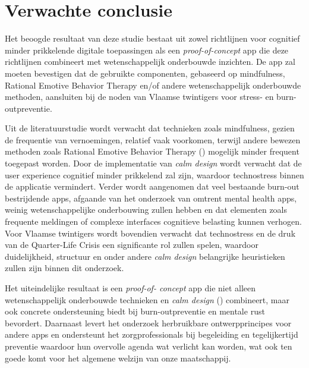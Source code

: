 \section{Verwachte conclusie}%
\label{sec:verwachte_resultaten}

\vspace{1em}

Het beoogde resultaat van deze studie bestaat uit zowel richtlijnen voor cognitief minder prikkelende digitale toepassingen als een \emph{proof-of-concept} app die deze richtlijnen combineert met wetenschappelijk onderbouwde inzichten. De app zal moeten bevestigen dat de gebruikte componenten, gebaseerd op mindfulness, Rational Emotive Behavior Therapy en/of andere wetenschappelijk onderbouwde methoden, aansluiten bij de noden van Vlaamse twintigers voor stress- en burn-outpreventie. 

\vspace{1em}

Uit de literatuurstudie wordt verwacht dat technieken zoals mindfulness, gezien de frequentie van vernoemingen, relatief vaak voorkomen, terwijl andere bewezen methoden zoals Rational Emotive Behavior Therapy (\textcite{Madigan2023}) mogelijk minder frequent toegepast worden. Door de implementatie van \emph{calm design} wordt verwacht dat de user experience cognitief minder prikkelend zal zijn, waardoor technostress binnen de applicatie vermindert. Verder wordt aangenomen dat veel bestaande burn-out bestrijdende apps, afgaande van het onderzoek van \textcite{Larsen2019} omtrent mental health apps, weinig wetenschappelijke onderbouwing zullen hebben en dat elementen zoals frequente meldingen of complexe interfaces cognitieve belasting kunnen verhogen. Voor Vlaamse twintigers wordt bovendien verwacht dat technostress en de druk van de Quarter-Life Crisis een significante rol zullen spelen, waardoor duidelijkheid, structuur en onder andere \emph{calm design} belangrijke heuristieken zullen zijn binnen dit onderzoek.

\vspace{1em}

Het uiteindelijke resultaat is een \emph{proof-of- \newline concept} app die niet alleen wetenschappelijk onderbouwde technieken en \emph{calm design} (\textcite{Peters2022}) combineert, maar ook concrete ondersteuning biedt bij burn-outpreventie en mentale rust bevordert. Daarnaast levert het onderzoek herbruikbare ontwerpprincipes voor andere apps en ondersteunt het zorgprofessionals bij begeleiding en tegelijkertijd preventie waardoor hun overvolle agenda wat verlicht kan worden, wat ook ten goede komt voor het algemene welzijn van onze maatschappij.